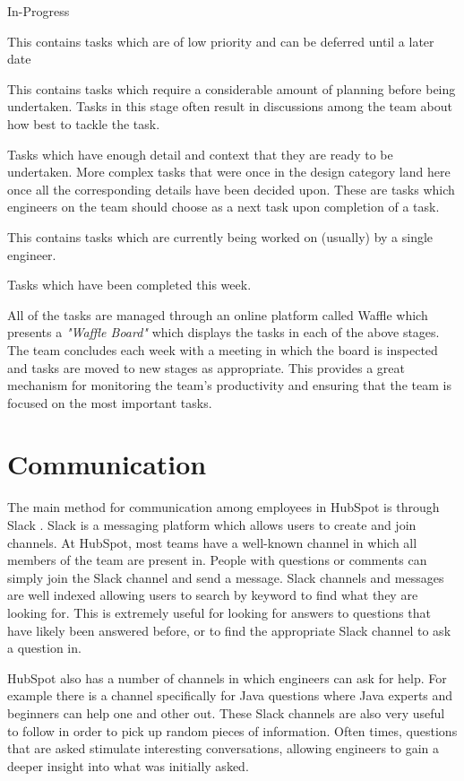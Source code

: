 \begin{labeling}{In-Progress}
	\item [Backlog] This contains tasks which are of low priority and can be deferred until a later date
	\item [Design] This contains tasks which require a considerable amount of planning before being undertaken. Tasks in this stage often result in discussions among the team about how best to tackle the task.
	\item [Ready] Tasks which have enough detail and context that they are ready to be undertaken. More complex tasks that were once in the design category land here once all the corresponding details have been decided upon. These are tasks which engineers on the team should choose as a next task upon completion of a task.
	\item [In-Progress] This contains tasks which are currently being worked on (usually) by a single engineer.
	\item [Completed] Tasks which have been completed this week.
\end{labeling}

All of the tasks are managed through an online platform called Waffle \cite{waffle} which presents a \textit{"Waffle Board"} which displays the tasks in each of the above stages. The team concludes each week with a meeting in which the board is inspected and tasks are moved to new stages as appropriate. This provides a great mechanism for monitoring the team's productivity and ensuring that the team is focused on the most important tasks. 

\section{Communication}
The main method for communication among employees in HubSpot is through Slack \cite{slack}. Slack is a messaging platform which allows users to create and join channels. At HubSpot, most teams have a well-known channel in which all members of the team are present in. People with questions or comments can simply join the Slack channel and send a message. Slack channels and messages are well indexed allowing users to search by keyword to find what they are looking for. This is extremely useful for looking for answers to questions that have likely been answered before, or to find the appropriate Slack channel to ask a question in.

HubSpot also has a number of channels in which engineers can ask for help. For example there is a channel specifically for Java questions where Java experts and beginners can help one and other out. These Slack channels are also very useful to follow in order to pick up random pieces of information. Often times, questions that are asked stimulate interesting conversations, allowing engineers to gain a deeper insight into what was initially asked.

